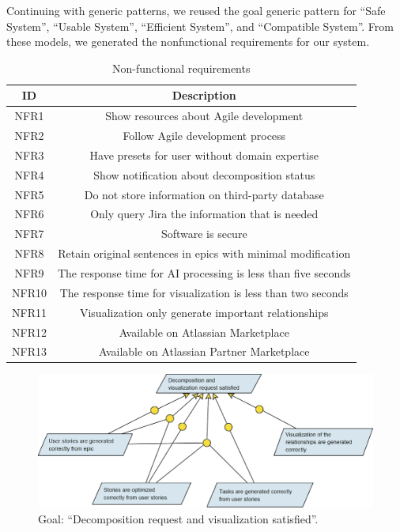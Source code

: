 Continuing with generic patterns, we reused the goal generic pattern for “Safe System”, “Usable System”, “Efficient System”, and “Compatible System”. From these models, we generated the nonfunctional requirements for our system.

\begin{center}
\begin{table}
\caption{Non-functional requirements}
\begin{tabular}{ |c|c| } 
\hline
\multicolumn{1}{|c|}{\textbf{ID}} & \multicolumn{1}{c|}{\textbf{Description}} \\
\hline
NFR1 & Show resources about Agile development \\
\hline
NFR2 & Follow Agile development process \\
\hline
NFR3 & Have presets for user without domain expertise \\
\hline
NFR4 & Show notification about decomposition status \\
\hline
NFR5 & Do not store information on third-party database \\
\hline
NFR6 & Only query Jira the information that is needed \\
\hline
NFR7 & Software is secure \\
\hline
NFR8 & Retain original sentences in epics with minimal modification \\
\hline
NFR9 & The response time for AI processing is less than five seconds \\
\hline
NFR10 & The response time for visualization is less than two seconds \\
\hline
NFR11 & Visualization only generate important relationships \\
\hline
NFR12 & Available on Atlassian Marketplace \\
\hline
NFR13 & Available on Atlassian Partner Marketplace \\
\hline
\end{tabular}
\end{table}
\end{center}

\begin{figure}
\centerline{\includegraphics[width=\textwidth,height=\textheight,keepaspectratio]{./figure/GoalsNFR2.png}}
\caption{Goal: “Decomposition request and visualization satisfied”.}
\end{figure}

